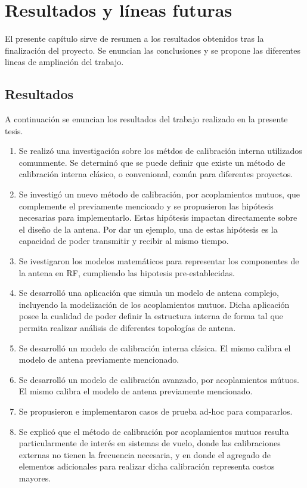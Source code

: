\chapter{Resultados y líneas futuras}

El presente capítulo sirve de resumen a los resultados obtenidos tras la finalización del proyecto. Se enuncian las 
conclusiones y se propone las diferentes lineas de ampliación del trabajo.

\section{Resultados}

A continuación se enuncian los resultados del trabajo realizado en la presente tesis. 
\begin{enumerate}
	\item Se realizó una investigación sobre los métdos de calibración interna utilizados comunmente. Se determinó que se puede
		definir que existe un método de calibración interna clásico, o convenional, común para diferentes proyectos.
	\item Se investigó un nuevo método de calibración, por acoplamientos mutuos, que complemente el previamente mencioado y se
		propusieron las hipótesis necesarias para implementarlo. Estas hipótesis impactan directamente sobre el diseño de la
		antena. Por dar un ejemplo, una de estas hipótesis es la capacidad de poder transmitir y recibir al mismo tiempo.
	\item Se ivestigaron los modelos matemáticos para representar los componentes de la antena en RF, cumpliendo las hipotesis
		pre-establecidas.
	\item Se desarrolló una aplicación que simula un modelo de antena complejo, incluyendo la modelización de los acoplamientos
		mutuos. Dicha aplicación posee la cualidad de poder definir la estructura interna de forma tal que permita realizar 
		análisis de diferentes topologías de antena.
	\item Se desarrolló un modelo de calibración interna clásica. El mismo calibra el modelo de antena previamente mencionado.
	\item Se desarrolló un modelo de calibración avanzado, por acoplamientos mútuos. El mismo calibra el modelo de antena
		previamente mencionado. 
	\item Se propusieron e implementaron casos de prueba ad-hoc para compararlos.
	\item Se explicó que el método de calibración por acoplamientos mutuos resulta particularmente de interés en sistemas de
		vuelo, donde las calibraciones externas no tienen la frecuencia necesaria, y en donde el agregado de elementos
	adicionales para realizar dicha calibración representa costos mayores.
\end{enumerate}

